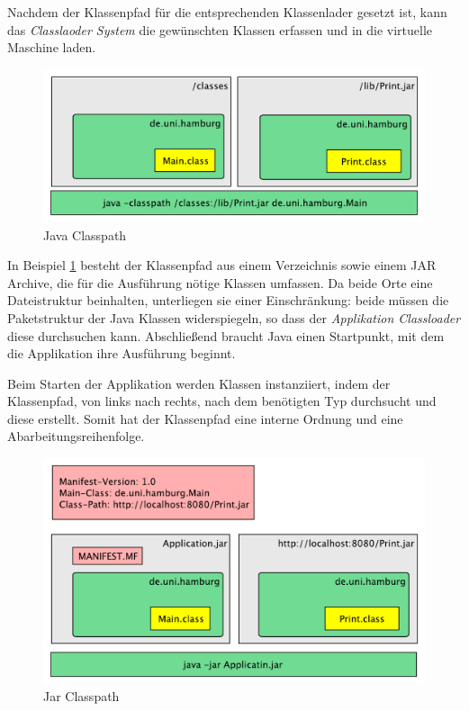  Nachdem der Klassenpfad für die entsprechenden Klassenlader gesetzt ist, kann das \textit{Classlaoder System} die gewünschten Klassen erfassen und in die virtuelle Maschine laden.

  \begin{figure}[h]
    \includegraphics[width=\textwidth]{material/images/Classpath2.pdf}
    \caption{Java Classpath}
    \label{fig:cps}
  \end{figure}

  In Beispiel \ref{fig:cps} besteht der Klassenpfad aus einem Verzeichnis sowie einem JAR Archive, die für die Ausführung nötige Klassen umfassen. Da beide Orte eine Dateistruktur beinhalten, unterliegen sie einer Einschränkung: beide müssen die Paketstruktur der Java Klassen widerspiegeln, so dass der \textit{Applikation Classloader} diese durchsuchen kann. Abschließend braucht Java einen Startpunkt, mit dem die Applikation ihre Ausführung beginnt. 

  Beim Starten der Applikation werden Klassen instanziiert, indem der Klassenpfad, von links nach rechts, nach dem benötigten Typ durchsucht und diese erstellt. Somit hat der Klassenpfad eine interne Ordnung und eine Abarbeitungsreihenfolge. 

  \begin{figure}[h]
    \includegraphics[width=\textwidth]{material/images/Classpath-Manifest2.pdf}
    \caption{Jar Classpath}
    \label{fig:cpa}
  \end{figure}

